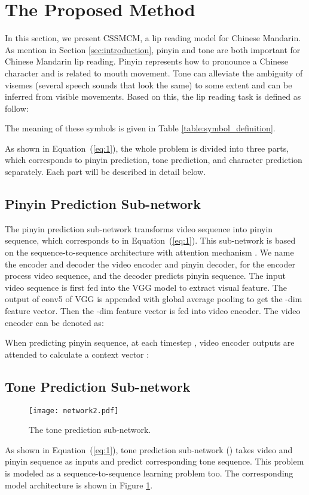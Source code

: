 \documentclass[sigconf]{acmart}
\begin{document}
\section{The Proposed Method}
In this section, we present CSSMCM, a lip reading model for Chinese Mandarin. As mention in Section \ref{sec:introduction}, pinyin and tone are both important for Chinese Mandarin lip reading. Pinyin represents how to pronounce a Chinese character and is related to mouth movement. Tone can alleviate the ambiguity of visemes (several speech sounds that look the same) to some extent and can be inferred from visible movements. Based on this, the lip reading task is defined as follow:
  
The meaning of these symbols is given in Table \ref{table:symbol_definition}.

As shown in Equation~(\ref{eq:1}), the whole problem is divided into three parts, which corresponds to pinyin prediction, tone prediction, and character prediction separately. Each part will be described in detail below.

\subsection{Pinyin Prediction Sub-network}\label{sec:pinyin_prediction_sub-network}

The pinyin prediction sub-network transforms video sequence into pinyin sequence, which corresponds to  in Equation~(\ref{eq:1}). This sub-network is based on the sequence-to-sequence architecture with attention mechanism \cite{bahdanau2015neural}. We name the encoder and decoder the video encoder and pinyin decoder, for the encoder process video sequence, and the decoder predicts pinyin sequence. The input video sequence is first fed into the VGG model \cite{chatfield2014return} to extract visual feature. The output of conv5 of VGG is appended with global average pooling \cite{lin2014network} to get the -dim feature vector. Then the -dim feature vector is fed into video encoder. The video encoder can be denoted as:

When predicting pinyin sequence, at each timestep , video encoder outputs are attended to calculate a context vector :




\subsection{Tone Prediction Sub-network}
\begin{figure}
\centering
\texttt{[image: network2.pdf]}
\caption{The tone prediction sub-network.}\label{fig:network2}
\end{figure}
As shown in Equation~(\ref{eq:1}), tone prediction sub-network () takes video and pinyin sequence as inputs and predict corresponding tone sequence. This problem is modeled as a sequence-to-sequence learning problem too. The corresponding model architecture is shown in Figure \ref{fig:network2}. 
\end{document}
